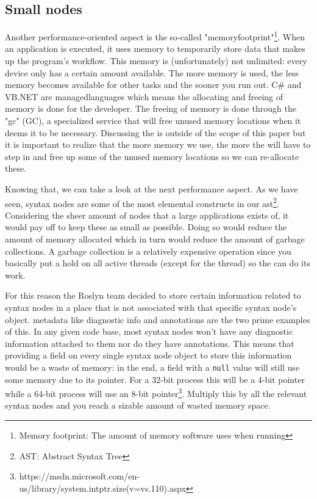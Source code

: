 \subsection{Small nodes}
\label{sec:small-nodes}

Another performance-oriented aspect is the so-called "\gls{memoryfootprint}"\footnote{Memory footprint: The amount of memory software uses when running}. When an application is executed, it uses memory to temporarily store data that makes up the program's workflow. This memory is (unfortunately) not unlimited: every device only has a certain amount available. The more memory is used, the less memory becomes available for other tasks and the sooner you run out. C\# and VB.NET are \glspl{managedlanguage} which means the allocating and freeing of memory is done for the developer. The freeing of memory is done through the "\gls{gc}" (GC), a specialized service that will free unused memory locations when it deems it to be necessary. Discussing the  is outside of the scope of this paper but it is important to realize that the more memory we use, the more the  will have to step in and free up some of the unused memory locations so we can re-allocate these.\parencite{Todorov2013}

Knowing that, we can take a look at the next performance aspect. As we have seen, syntax nodes are some of the most elemental constructs in our \gls{ast}\footnote{AST: Abstract Syntax Tree}. Considering the sheer amount of nodes that a large applications exists of, it would pay off to keep these as small as possible. Doing so would reduce the amount of memory allocated which in turn would reduce the amount of garbage collections. A garbage collection is a relatively expensive operation since you basically put a hold on all active threads (except for the  thread) so the  can do its work.\parencite{Botelho2014}

For this reason the Roslyn team decided to store certain information related to syntax nodes in a place that is not associated with that specific syntax node's object.\parencite{Sadov2014} \Gls{metadata} like diagnostic info and annotations are the two prime examples of this. In any given code base, most syntax nodes won't have any diagnostic information attached to them nor do they have annotations. This means that providing a field on every single syntax node object to store this information would be a waste of memory: in the end, a field with a \texttt{null} value will still use some memory due to its pointer. For a 32-bit process this will be a 4-bit pointer while a 64-bit process will use an 8-bit pointer\footnote{https://msdn.microsoft.com/en-us/library/system.intptr.size(v=vs.110).aspx}. Multiply this by all the relevant syntax nodes and you reach a sizable amount of wasted memory space.

